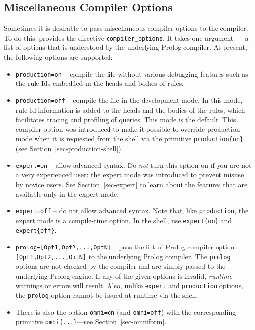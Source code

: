 \documentclass[11pt]{article}
\newcommand{\ERGO}{\mbox{\smaller{\ensuremath{\cal{E}}\smaller{{\sc{RGO}}}}}\xspace}
\newcommand{\FLSYSTEM}{\ERGO}
\begin{document}
\subsection{Miscellaneous Compiler Options}\label{misc-options}

Sometimes it is desirable to pass miscellaneous 
compiler options to the \FLSYSTEM
compiler. To do this, \FLSYSTEM provides the directive
{\tt compiler\_options}. It takes one argument --- a list of
options that is understood by the underlying Prolog compiler. At present,
the following options are supported:
\begin{itemize}
\item  \texttt{production=on} -- compile the file without various
  debugging features such as the rule Ids embedded in the heads and bodies
  of rules.
\item \texttt{production=off} -- compile the file in the development
  mode. In this mode, rule Id information is added to the heads and the
  bodies of the rules, which facilitates tracing and profiling of \FLSYSTEM
  queries. This mode is the default. This compiler option was introduced to
  make it possible to override production mode when it is
  requested from the \FLSYSTEM shell via the primitive
  \texttt{production\{on\}} (see Section~\ref{sec-production-shell}).
\item \texttt{expert=on} -- allow advanced syntax. 
  Do \emph{not} turn this option on if you are not a very
  experienced \FLSYSTEM user:
  the expert mode was introduced to prevent misuse by novice users.
  See Section~\ref{sec-expert} to learn about the features that are
  available only in the expert mode.
\item \texttt{expert=off} -- do not allow advanced syntax. Note that,
  like \texttt{production}, the expert mode is a compile-time option.
  In the \FLSYSTEM shell, use \texttt{expert\{on\}} and
  \texttt{expert\{off\}}.
\item \texttt{prolog=[Opt1,Opt2,...,OptN]} -- pass the list of Prolog
  compiler options \texttt{[Opt1,Opt2,...,OptN]} to the underlying Prolog
  compiler.  The \texttt{prolog} options are not checked by the \FLSYSTEM
  compiler and are simply passed to the underlying Prolog engine. If any of
  the given options is invalid, \emph{runtime} warnings or errors will result.
  Also, unlike \texttt{expert} and \texttt{production} options, the
  \texttt{prolog} option cannot be issued at runtime via the \FLSYSTEM
  shell.
  \item There is also the option \texttt{omni=on} (and
    \texttt{omni=off}) with the corresponding primitive
    \texttt{omni\{...\}}---see Section~\ref{sec-omniform}.
\end{itemize}
\end{document}
